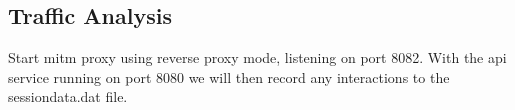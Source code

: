 \hypertarget{traffic-analysis}{%
\subsection{Traffic Analysis}\label{traffic-analysis}}

Start mitm proxy using reverse proxy mode, listening on port 8082. With
the api service running on port 8080 we will then record any
interactions to the sessiondata.dat file.

\begin{Shaded}
\begin{Highlighting}[]
\end{Highlighting}
\end{Shaded}


